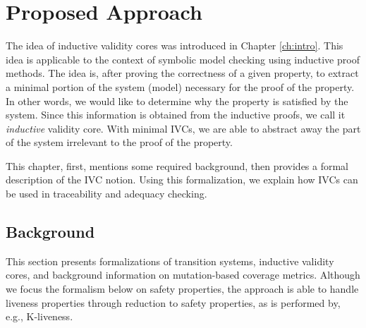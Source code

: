 \chapter{Proposed Approach}
\label{ch:prop}
The idea of inductive validity cores was introduced in Chapter \ref{ch:intro}.
This idea is applicable to the context of symbolic model checking using inductive proof methods. The idea is, after proving the correctness of a given property, to extract a minimal portion of the system (model) necessary for the proof of the property. In other words, we would like to determine why the property is satisfied by the system. Since this information is obtained from the inductive proofs, we call it \emph{inductive} validity core. With minimal IVCs, we are able to abstract away the part of the system irrelevant to the proof of the property.

This chapter, first, mentions some required background, then provides a formal description of the IVC notion. Using this formalization, we explain how IVCs can be used in traceability and adequacy checking.

\section{Background}

\newcommand{\satisfies}{\vdash_{\!\!s}}
\newcommand{\nsatisfies}{\nvdash_{\!\!s}}
\newcommand{\bool}[0]{\mathit{bool}}
\newcommand{\reach}[0]{\mathit{R}}
\newcommand{\ite}[3]{\mathit{if}\ {#1}\ \mathit{then}\ {#2}\ \mathit{else}\ {#3}}
\newcommand{\ivc}{\textit{IVC}}
\newcommand{\mivc}{\textit{MIVC}}

This section presents formalizations of transition systems, inductive validity cores, and background information on mutation-based coverage metrics.  Although we focus the formalism below on safety properties, the approach is able to handle liveness properties through reduction to safety properties, as is performed by, e.g., K-liveness.

